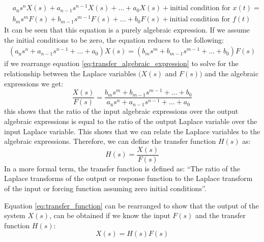 \documentclass[12pt,letter]{article}
\begin{document}
\begin{eqnarray}
&a_\text{n}s^nX(s) + a_{n-1}s^{n-1}X(s) + ... + a_0X(s) + \text{initial condition for } x(t) =   \\
&b_ms^mF(s) + b_{m-1}s^{m-1}F(s) + ... + b_0F(s) + \text{initial condition for } f(t)  \nonumber
\end{eqnarray}
It can be seen that this equation is a purely algebraic expression. If we assume the initial conditions to be zero, the equation reduces to the following:
\begin{eqnarray}
(a_\text{n}s^n + a_{n-1}s^{n-1} + ... + a_0)X(s) =  (b_ms^m + b_{m-1}s^{m-1} + ... + b_0)F(s) 
\label{eq:transfer_algebraic_expression}
\end{eqnarray}
if we rearrange equation \ref{eq:transfer_algebraic_expression} to solve for the relationship between the Laplace variables $\big( X(s)$ and $F(s) \big)$ and the algebraic expressions we get:
\begin{equation}
\frac{X(s)}{F(s)} = \frac{b_ms^m + b_{m-1}s^{m-1} + ... + b_0}{a_\text{n}s^n + a_{n-1}s^{n-1} + ... + a_0}
\end{equation}
this shows that the ratio of the input algebraic expressions over the output algebraic expressions is equal to the ratio of the output Laplace variable over the input Laplace variable. This shows that we can relate the Laplace variables to the algebraic expressions. Therefore, we can define the transfer function $H(s)$ as: 
\begin{equation}
H(s) = \frac{X(s)}{F(s)}
\label{eq:transfer_function}
\end{equation}
In a more formal term, the transfer function is defined as: ``The ratio of the Laplace transforms of the output or response function to the Laplace transform of the input or forcing function assuming zero initial conditions''.

Equation \ref{eq:transfer_function} can be rearranged to show that the output of the system $X(s)$, can be obtained if we know the input $F(s)$ and the transfer function $H(s)$:
\begin{equation}
X(s) = H(s)F(s)
\end{equation}	
\end{document}
